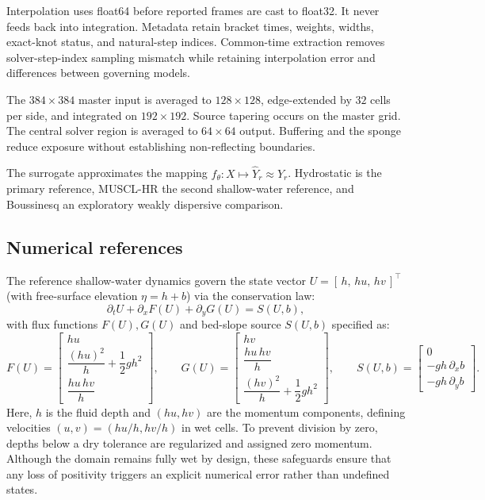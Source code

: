 Interpolation uses float64 before reported frames are cast to float32. It never feeds back into integration. Metadata retain bracket times, weights, widths, exact-knot status, and natural-step indices. Common-time extraction removes solver-step-index sampling mismatch while retaining interpolation error and differences between governing models.

The $384 \times 384$ master input is averaged to $128 \times 128$, edge-extended by $32$ cells per side, and integrated on $192 \times 192$. Source tapering occurs on the master grid. The central solver region is averaged to $64 \times 64$ output. Buffering and the sponge reduce exposure without establishing non-reflecting boundaries.

The surrogate approximates the mapping $f_\theta:X \mapsto\widehat{Y}_r\approx Y_r$.
Hydrostatic is the primary reference, MUSCL-HR the second shallow-water reference, and Boussinesq an exploratory weakly dispersive comparison.

\subsection{Numerical references}
\label{subsec:numerical-reference-formulation}
The reference shallow-water dynamics govern the state vector $U = [\, h, \, hu, \, hv \,]^\top$ (with free-surface elevation $\eta = h + b$) via the conservation law:
\begin{equation}
\partial_t U + \partial_x F(U) + \partial_y G(U) = S(U, b),
\end{equation}
with flux functions $F(U), G(U)$ and bed-slope source $S(U, b)$ specified as:
\begin{equation}
F(U) =
\begin{bmatrix}
    hu \\[2pt]
    \dfrac{(hu) ^ 2}{h} + \dfrac{1}{2}gh ^ 2 \\[6pt]
    \dfrac{hu\, hv}{h}    
\end{bmatrix},
\qquad
G(U) =
\begin{bmatrix}
    hv \\[2pt]
    \dfrac{hu\, hv}{h} \\[6pt]
    \dfrac{(hv) ^ 2}{h} + \dfrac{1}{2}gh ^ 2
\end{bmatrix},
\qquad
S(U, b) =
\begin{bmatrix}
    0 \\
    -gh\, \partial_x b \\
    -gh\, \partial_y b
\end{bmatrix}.
\end{equation}
Here, $h$ is the fluid depth and $(hu, hv)$ are the momentum components, defining velocities $(u, v) = (hu/h, hv/h)$ in wet cells. To prevent division by zero, depths below a dry tolerance are regularized and assigned zero momentum. Although the domain remains fully wet by design, these safeguards ensure that any loss of positivity triggers an explicit numerical error rather than undefined states.

